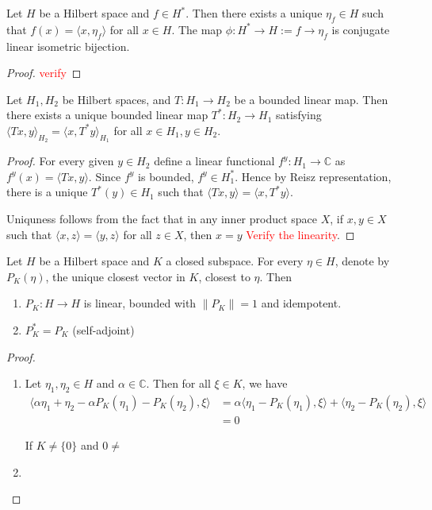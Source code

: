 \begin{theorem}
  Let $H$ be a Hilbert space and $f \in H^*$. Then there exists a
  unique $\eta_f \in H$ such that $f(x) = \langle x , \eta_f \rangle $
  for all $ x \in H$. The map $\phi: H^* \to H := f \to \eta_f$ is
  conjugate linear isometric bijection.
\end{theorem}
\begin{proof}
  \textcolor{red}{verify}
\end{proof}

\begin{theorem}
  Let $H_1, H_2$ be Hilbert spaces, and $T: H_1 \to H_2$ be a bounded
  linear map. Then there exists a unique bounded linear map $T^*: H_2
  \to H_1$ satisfying $\langle  Tx , y \rangle_{H_2} = \langle x ,
  T^*y \rangle_{H_1}$ for all $x \in H_1, y \in H_2$.
\end{theorem}
\begin{proof}
  For every given $y \in H_2$ define a linear functional $f^y: H_1
  \to \mathbb{C}$ as $f^y(x) = \langle Tx , y \rangle$. Since $f^{y}$
  is bounded, $f^y \in H_1^*$. Hence by Reisz representation, there
  is a unique $T^*(y) \in H_1$ such that $\langle  Tx , y \rangle =
  \langle x , T^*y \rangle$.

  Uniquness follows from the fact that in any inner product space
  $X$, if $x, y \in X$ such that $ \langle x , z \rangle = \langle  y
  , z \rangle $ for all $z \in X$, then $x = y$
  \textcolor{red}{Verify the linearity}.
\end{proof}

\begin{theorem}
  Let $H$ be a Hilbert space and $K$ a closed subspace. For every
  $\eta \in H$, denote by $P_K(\eta)$, the unique closest vector in
  $K$, closest to $\eta$. Then
  \begin{enumerate}[label=(\arabic*)]
    \item $P_K: H \to H$ is linear, bounded with $\|P_K\| = 1$ and idempotent.
    \item $P_K^* = P_K$ (self-adjoint)
  \end{enumerate}
\end{theorem}
\begin{proof}
  \begin{enumerate}[label=(\arabic*)]
    \item Let $\eta_1, \eta_2 \in H$ and $\alpha \in \mathbb{C}$.
      Then for all $\xi \in K$, we have
      \begin{align*}
        \langle  \alpha \eta_1
        +\eta_2 - \alpha P_K( \eta_1) - P_K(\eta_2) , \xi \rangle &=
        \alpha \langle \eta_1 - P_K(\eta_1) , \xi  \rangle + \langle
        \eta_2 - P_K(\eta_2) , \xi  \rangle  \\
        &= 0
      \end{align*}

      If $K \neq \{ 0\}$ and $0 \neq $
    \item
  \end{enumerate}
\end{proof}


